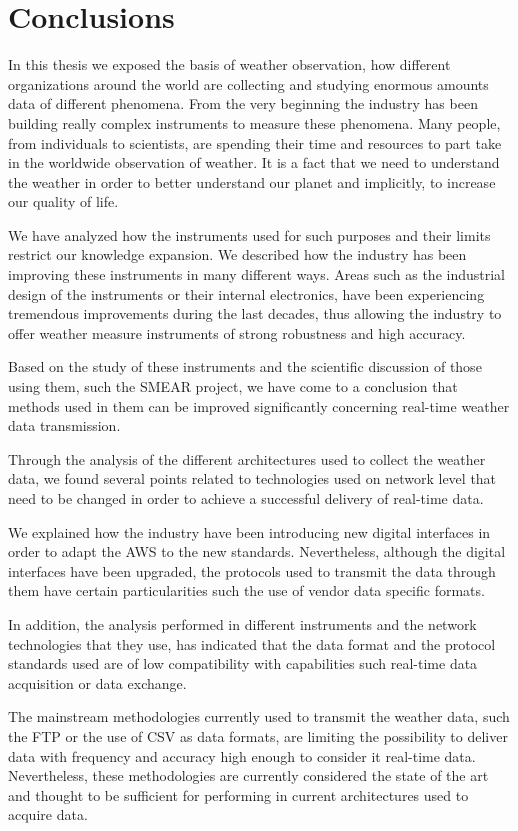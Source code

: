 
\chapter{Conclusions}

In this thesis we exposed the basis of weather observation, how different organizations around the world are collecting and studying enormous amounts data of different phenomena. From the very beginning the industry has been building really complex instruments to measure these phenomena. Many people, from individuals to scientists, are spending their time and resources to part take in the worldwide observation of weather. It is a fact that we need to understand the weather in order to better understand our planet and implicitly, to increase our quality of life.

We have analyzed how the instruments used for such purposes and their limits restrict our knowledge expansion. We described how the industry has been improving these instruments in many different  ways. Areas such as the industrial design of the instruments or their internal electronics, have been experiencing tremendous improvements during the last decades, thus allowing the industry to offer weather measure instruments of strong robustness and high accuracy.

Based on the study of these instruments and the scientific discussion of those using them, such the SMEAR project\cite{SMEAR}, we have come to a conclusion that methods used in them can be improved significantly concerning real-time weather data transmission.

Through the analysis of the different architectures used to collect the weather data, we found several points related to technologies used on network level that need to be changed in order to achieve a successful delivery of real-time data.

We explained how the industry have been introducing new digital interfaces in order to adapt the \gls{AWS} to the new standards. Nevertheless, although the digital interfaces have been upgraded, the protocols used to transmit the data through them have certain particularities such the use of vendor data specific formats.

In addition, the analysis performed in different instruments and the network technologies that they use, has indicated that the data format and the protocol standards used are of low compatibility with capabilities such real-time data acquisition or data exchange.

The mainstream methodologies currently used to transmit the weather data, such the \gls{FTP} or the use of \gls{CSV} as data formats, are limiting the possibility to deliver data with frequency and accuracy high enough to consider it real-time data. Nevertheless, these methodologies are currently considered the state of the art and thought to be sufficient for performing in current architectures used to acquire data.

